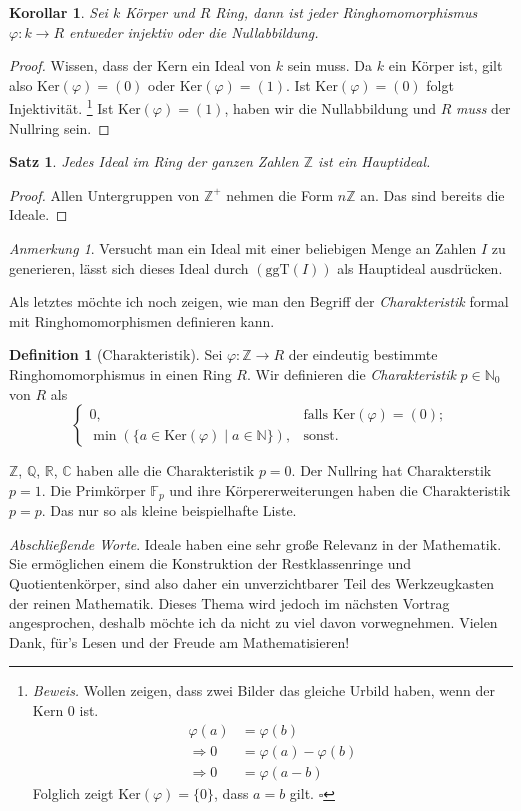\documentclass{article}
\newtheorem*{satz}{Satz}
\newtheorem*{cor}{Korollar}
\theoremstyle{definition}
\newtheorem*{definition}{Definition}
\theoremstyle{remark}
\newtheorem*{anm}{Anmerkung}
\begin{document}
\begin{cor}
Sei $k$ Körper und $R$ Ring, dann ist jeder Ringhomomorphismus $\varphi:k\to R$ entweder injektiv oder die
Nullabbildung.
\end{cor}
\begin{proof}
Wissen, dass der Kern ein Ideal von $k$ sein muss. Da $k$ ein Körper ist, gilt also $\mathrm{Ker}(\varphi)=(0)$
oder $\mathrm{Ker}(\varphi)=(1)$. Ist $\mathrm{Ker}(\varphi)=(0)$ folgt Injektivität.
\footnote{\textit{Beweis.}
Wollen zeigen, dass zwei Bilder das gleiche Urbild haben, wenn der Kern $0$ ist.
\begin{align*}
\varphi(a) &= \varphi(b) \\
\Rightarrow 0 &= \varphi(a)-\varphi(b) \\
\Rightarrow 0 &= \varphi(a-b)
\end{align*}
Folglich zeigt $\mathrm{Ker}(\varphi)=\{0\}$, dass $a=b$ gilt. \hfill$\square$
}
Ist $\mathrm{Ker}(\varphi)=(1)$, haben wir die Nullabbildung und $R$ \emph{muss} der Nullring sein.
\end{proof}

\begin{satz}
Jedes Ideal im Ring der ganzen Zahlen $\mathbb Z$ ist ein Hauptideal.
\end{satz}
\begin{proof}
Allen Untergruppen von $\mathbb Z^+$ nehmen die Form $n\mathbb Z$ an. Das sind bereits die Ideale.
\end{proof}

\begin{anm}
Versucht man ein Ideal mit einer beliebigen Menge an Zahlen $I$ zu generieren, lässt sich dieses Ideal durch
$(\mathrm{ggT}(I))$ als Hauptideal ausdrücken.
\end{anm}

Als letztes möchte ich noch zeigen, wie man den Begriff der \emph{Charakteristik} formal mit Ringhomomorphismen
definieren kann.

\begin{definition}[Charakteristik]
Sei $\varphi: \mathbb Z\to R$ der eindeutig bestimmte Ringhomomorphismus in einen Ring $R$. Wir definieren die
\emph{Charakteristik} $p\in\mathbb N_0$ von $R$ als
\[\begin{cases}
    0, &\text{falls }\mathrm{Ker}(\varphi)=(0); \\
    \min\left(\{a\in \mathrm{Ker}(\varphi) \mid a\in\mathbb N\}\right), &\text{sonst.}
\end{cases}\]
\end{definition}
$\mathbb Z$, $\mathbb Q$, $\mathbb R$, $\mathbb C$ haben alle die Charakteristik $p=0$.
Der Nullring hat Charakterstik $p=1$. Die Primkörper $\mathbb F_{p}$ und ihre Körpererweiterungen haben
die Charakteristik $p=p$. Das nur so als kleine beispielhafte Liste.

\vspace{3em}
\emph{Abschließende Worte}.
Ideale haben eine sehr große Relevanz in der Mathematik. Sie ermöglichen einem die Konstruktion der
Restklassenringe und Quotientenkörper, sind also daher ein unverzichtbarer Teil des
Werkzeugkasten der reinen Mathematik. Dieses Thema wird jedoch im nächsten Vortrag angesprochen, deshalb
möchte ich da nicht zu viel davon vorwegnehmen. Vielen Dank, für's Lesen und der Freude am Mathematisieren!
\end{document}
